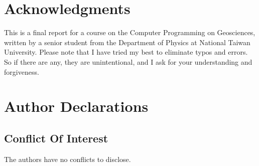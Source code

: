 \documentclass[a4paper, 12pt, oneside, onecolumn]{article}
\begin{document}
\newpage
\section*{Acknowledgments}
This is a final report for a course on the Computer Programming on Geosciences, written by a senior student from the Department of Physics at National Taiwan University. Please note that I have tried my best to eliminate typos and errors. So if there are any, they are unintentional, and I ask for your understanding and forgiveness.
\section*{Author Declarations}
\subsection*{Conflict Of Interest}
The authors have no conflicts to disclose.
\newpage
\nocite{*}


\end{document}
